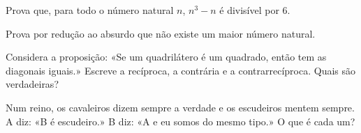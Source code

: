 \documentclass[12pt]{article}
\begin{document}
\begin{exercicios}
  \item Prova que, para todo o número natural $n$, $n^3 - n$ é divisível por 6.
  \item Prova por redução ao absurdo que não existe um maior número natural.
  \item Considera a proposição: «Se um quadrilátero é um quadrado, então tem as diagonais iguais.» Escreve a recíproca, a contrária e a contrarrecíproca. Quais são verdadeiras?
  \item Num reino, os cavaleiros dizem sempre a verdade e os escudeiros mentem sempre. A diz: «B é escudeiro.» B diz: «A e eu somos do mesmo tipo.» O que é cada um?
\end{exercicios}
\end{document}

